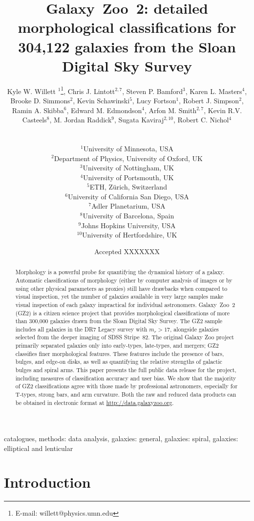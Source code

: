\documentclass[useAMS,usenatbib]{mn2e}
\title[GZ2 data release]{Galaxy~Zoo~2: detailed morphological classifications for 304,122 galaxies from the Sloan Digital Sky Survey}
\author[Willett et al.]{
  \parbox[t]{16cm}{
  Kyle W. Willett $^{1}$\thanks{E-mail: willett@physics.umn.edu},
  Chris J. Lintott$^{2,7}$,
  Steven P. Bamford$^{3}$,
  Karen L. Masters$^{4}$,
  Brooke D. Simmons$^{2}$,
  Kevin Schawinski$^{5}$,
  Lucy Fortson$^{1}$,
  Robert J. Simpson$^{2}$,
  Ramin A. Skibba$^{6}$,
  Edward M. Edmondson$^{4}$,
  Arfon M. Smith$^{2,7}$,
  Kevin R.V. Casteels$^{8}$,
  M. Jordan Raddick$^{9}$,
  Sugata Kaviraj$^{2,10}$,
  Robert C. Nichol$^{4}$\\
  }\\
$^{1}$University of Minnesota, USA \\
$^{2}$Department of Physics, University of Oxford, UK \\
$^{3}$University of Nottingham, UK \\
$^{4}$University of Portsmouth, UK \\
$^{5}$ETH, Z\"urich, Switzerland \\
$^{6}$University of California San Diego, USA \\
$^{7}$Adler Planetarium, USA \\
$^{8}$University of Barcelona, Spain \\
$^{9}$Johns Hopkins University, USA \\
$^{10}$University of Hertfordshire, UK \\
}
\begin{document}
\date{Accepted XXXXXXX}

\pagerange{\pageref{firstpage}--\pageref{lastpage}} 

\maketitle

\label{firstpage}

\begin{abstract}
Morphology is a powerful probe for quantifying the dynamical history of a galaxy. Automatic classifications of morphology (either by computer analysis of images or by using other physical parameters as proxies) still have drawbacks when compared to visual inspection, yet the number of galaxies available in very large samples make visual inspection of each galaxy impractical for individual astronomers. Galaxy~Zoo~2 (GZ2) is a citizen science project that provides morphological classifications of more than 300,000 galaxies drawn from the Sloan Digital Sky Survey. The GZ2 sample includes all galaxies in the DR7 Legacy survey with $m_r>17$, alongside galaxies selected from the deeper imaging of SDSS Stripe~82. The original Galaxy Zoo project primarily separated galaxies only into early-types, late-types, and mergers; GZ2 classifies finer morphological features. These features include the presence of bars, bulges, and edge-on disks, as well as quantifying the relative strengths of galactic bulges and spiral arms. This paper presents the full public data release for the project, including measures of classification accuracy and user bias. We show that the majority of GZ2 classifications agree with those made by professional astronomers, especially for T-types, strong bars, and arm curvature. Both the raw and reduced data products can be obtained in electronic format at \url{http://data.galaxyzoo.org}.
\end{abstract}

\begin{keywords}
catalogues, methods: data analysis, galaxies: general, galaxies: spiral, galaxies: elliptical and lenticular
\end{keywords}


\section{Introduction} \label{sec-intro}
\end{document}
